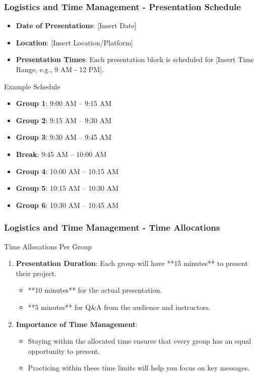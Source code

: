 \documentclass[aspectratio=169]{beamer}
\begin{document}
\begin{frame}[fragile]
    \frametitle{Logistics and Time Management - Presentation Schedule}
    \begin{itemize}
        \item \textbf{Date of Presentations}: [Insert Date]
        \item \textbf{Location}: [Insert Location/Platform]
        \item \textbf{Presentation Times}: Each presentation block is scheduled for [Insert Time Range, e.g., 9 AM - 12 PM]. 
    \end{itemize}
    
    \begin{block}{Example Schedule}
        \begin{itemize}
            \item \textbf{Group 1}: 9:00 AM – 9:15 AM
            \item \textbf{Group 2}: 9:15 AM – 9:30 AM
            \item \textbf{Group 3}: 9:30 AM – 9:45 AM
            \item \textbf{Break}: 9:45 AM – 10:00 AM
            \item \textbf{Group 4}: 10:00 AM – 10:15 AM
            \item \textbf{Group 5}: 10:15 AM – 10:30 AM
            \item \textbf{Group 6}: 10:30 AM – 10:45 AM
        \end{itemize}
    \end{block}
\end{frame}

\begin{frame}[fragile]
    \frametitle{Logistics and Time Management - Time Allocations}
    \begin{block}{Time Allocations Per Group}
        \begin{enumerate}
            \item \textbf{Presentation Duration}: Each group will have **15 minutes** to present their project.
            \begin{itemize}
                \item **10 minutes** for the actual presentation.
                \item **5 minutes** for Q\&A from the audience and instructors.
            \end{itemize}
            \item \textbf{Importance of Time Management}: 
            \begin{itemize}
                \item Staying within the allocated time ensures that every group has an equal opportunity to present.
                \item Practicing within these time limits will help you focus on key messages.
            \end{itemize}
        \end{enumerate}
    \end{block}
\end{frame}
\end{document}
